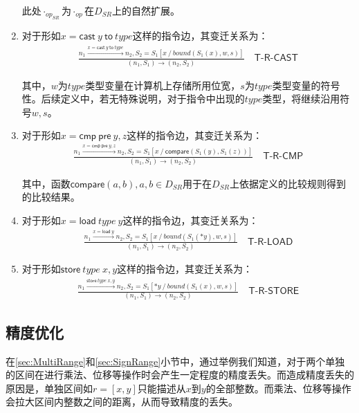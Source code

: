 \begin{enumerate}[（1）]
此处$ \cdot_{op_{SR}} $为$ \cdot_{op} $在$ D_{SR} $上的自然扩展。

\item 对于形如$ x = \mathsf{cast}  ~y ~\mathsf{to} ~type$这样的指令边，其变迁关系为：
\begin{align}
\frac{n_1 \xrightarrow{x = \mathsf{cast}  ~y ~\mathsf{to} ~type} n_2, 
	S_2 = S_1[x ~/~ bound(S_1(x), w, s) ]}
{(n_1, S_1) \to (n_2, S_2)}
\quad\textsf{T-R-CAST}
\end{align}

其中，$ w $为$ type $类型变量在计算机上存储所用位宽，$ s $为$ type $类型变量的符号性。后续定义中，若无特殊说明，对于指令中出现的$ type $类型，将继续沿用符号$ w, s $。

\item 对于形如$ x = \mathsf{cmp~pre}  ~y, z$这样的指令边，其变迁关系为：
\begin{align}
\frac{n_1 \xrightarrow{x = \mathsf{cmp~pre}  ~y, z} n_2, 
	S_2 = S_1[x ~/~ \mathsf{compare}(S_1(y), S_1(z)) ]}
{(n_1, S_1) \to (n_2, S_2)}
\quad\textsf{T-R-CMP}
\end{align}

其中，函数$ \mathsf{compare}(a, b), a, b\in D_{SR} $用于在$ D_{SR} $上依据定义的比较规则得到的比较结果。

\item 对于形如$ x = \mathsf{load} ~type ~y $这样的指令边，其变迁关系为：
\begin{align}
\frac{n_1 \xrightarrow{x = \mathsf{load}  ~y } n_2, 
	S_2 = S_1[x ~/~ bound(S_1(*y), w, s)]}
{(n_1, S_1) \to (n_2, S_2)}
\quad\textsf{T-R-LOAD}
\end{align}

\item 对于形如$ \mathsf{store}  ~type ~x, y $这样的指令边，其变迁关系为：
\begin{align}
\frac{n_1 \xrightarrow{\mathsf{store}  ~type ~x, y} n_2, 
	S_2 = S_1[*y ~/~ bound(S_1(x), w, s)]}
{(n_1, S_1) \to (n_2, S_2)}
\quad\textsf{T-R-STORE}
\end{align}

\end{enumerate}

\subsection{精度优化}

在\ref{sec:MultiRange}和\ref{sec:SignRange}小节中，通过举例我们知道，对于两个单独的区间在进行乘法、位移等操作时会产生一定程度的精度丢失。而造成精度丢失的原因是，单独区间如$ r = [x, y] $只能描述从$ x $到$ y $的全部整数。而乘法、位移等操作会拉大区间内整数之间的距离，从而导致精度的丢失。

